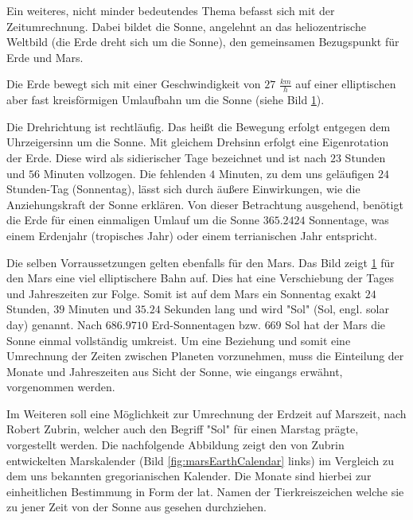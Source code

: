 Ein weiteres, nicht minder bedeutendes Thema befasst sich mit der
Zeitumrechnung. Dabei bildet die Sonne, angelehnt an das heliozentrische
Weltbild (die Erde dreht sich um die Sonne), den gemeinsamen Bezugspunkt für
Erde und Mars.

Die Erde bewegt sich mit einer Geschwindigkeit von $27$ $\frac{km}{h}$ auf einer
elliptischen aber fast kreisförmigen Umlaufbahn um die Sonne (siehe Bild
\ref{fig:marsEarthOrbit}).

\begin{figure}[H]
	\centering
	\label{fig:marsEarthOrbit}
\end{figure}

Die Drehrichtung ist rechtläufig. Das heißt die Bewegung erfolgt entgegen dem
Uhrzeigersinn um die Sonne. Mit gleichem Drehsinn erfolgt eine Eigenrotation
der Erde. Diese wird als sidierischer Tage bezeichnet und ist nach $23$ Stunden
und $56$ Minuten vollzogen. Die fehlenden $4$ Minuten, zu dem uns geläufigen
$24$ Stunden-Tag (Sonnentag), lässt sich durch äußere Einwirkungen, wie die
Anziehungskraft der Sonne erklären. Von dieser Betrachtung ausgehend, benötigt
die Erde für einen einmaligen Umlauf um die Sonne $365.2424$ Sonnentage, was
einem Erdenjahr (tropisches Jahr) oder einem terrianischen Jahr entspricht. 

Die selben Vorraussetzungen gelten ebenfalls für den Mars. Das Bild zeigt
\ref{fig:marsEarthOrbit} für den Mars eine viel elliptischere Bahn auf. Dies hat
eine Verschiebung der Tages und Jahreszeiten zur Folge. Somit ist auf dem Mars
ein Sonnentag exakt $24$ Stunden, $39$ Minuten und $35.24$ Sekunden lang und
wird "Sol" (Sol, engl. solar day) genannt. Nach $686.9710$ Erd-Sonnentagen bzw.
$669$ Sol hat der Mars die Sonne einmal vollständig umkreist. Um eine Beziehung
und somit eine Umrechnung der Zeiten zwischen Planeten vorzunehmen, muss die
Einteilung der Monate und Jahreszeiten aus Sicht der Sonne, wie eingangs
erwähnt, vorgenommen werden. 

Im Weiteren soll eine Möglichkeit zur Umrechnung der Erdzeit auf Marszeit, nach
Robert Zubrin,  welcher auch den Begriff "Sol" für einen Marstag prägte,
vorgestellt werden. Die nachfolgende Abbildung zeigt den von Zubrin entwickelten
Marskalender (Bild \ref{fig:marsEarthCalendar} links) im Vergleich zu dem uns
bekannten gregorianischen Kalender. Die Monate sind hierbei zur einheitlichen
Bestimmung in Form der lat. Namen der Tierkreiszeichen welche sie zu jener Zeit
von der Sonne aus gesehen durchziehen.

